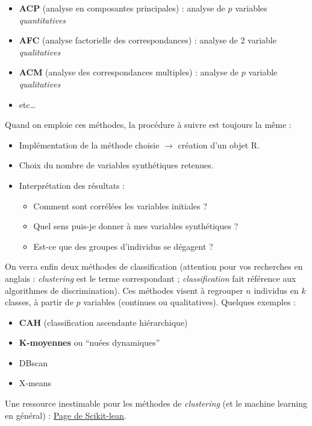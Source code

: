 \documentclass[]{book}
\providecommand{\tightlist}{%
  \setlength{\itemsep}{0pt}\setlength{\parskip}{0pt}}
\begin{document}
\begin{itemize}
\tightlist
\item
  \textbf{ACP} (analyse en composantes principales) : analyse de \(p\) variables \emph{quantitatives}
\item
  \textbf{AFC} (analyse factorielle des correspondances) : analyse de 2 variable \emph{qualitatives}
\item
  \textbf{ACM} (analyse des correspondances multiples) : analyse de \(p\) variable \emph{qualitatives}
\item
  etc\ldots{}
\end{itemize}

Quand on emploie ces méthodes, la procédure à suivre est toujours la même :

\begin{itemize}
\tightlist
\item
  Implémentation de la méthode choisie \(\rightarrow\) création d'un objet R.
\item
  Choix du nombre de variables synthétiques retenues.
\item
  Interprétation des résultats :

  \begin{itemize}
  \tightlist
  \item
    Comment sont corrélées les variables initiales ?
  \item
    Quel sens puis-je donner à mes variables synthétiques ?
  \item
    Est-ce que des groupes d'individus se dégagent ?
  \end{itemize}
\end{itemize}

On verra enfin deux méthodes de classification (attention pour vos recherches en anglais : \emph{clustering} est le terme correspondant ; \emph{classification} fait référence aux algorithmes de discrimination). Ces méthodes visent à regrouper \(n\) individus en \(k\) classes, à partir de \(p\) variables (continues ou qualitatives). Quelques exemples :

\begin{itemize}
\tightlist
\item
  \textbf{CAH} (classification ascendante hiérarchique)
\item
  \textbf{K-moyennes} ou ``nuées dynamiques''
\item
  DBscan
\item
  X-means
\end{itemize}

Une ressource inestimable pour les méthodes de \emph{clustering} (et le machine learning en général) : \href{http://scikit-learn.org/stable/modules/clustering.html\#clustering}{Page de Scikit-lean}.
\end{document}
